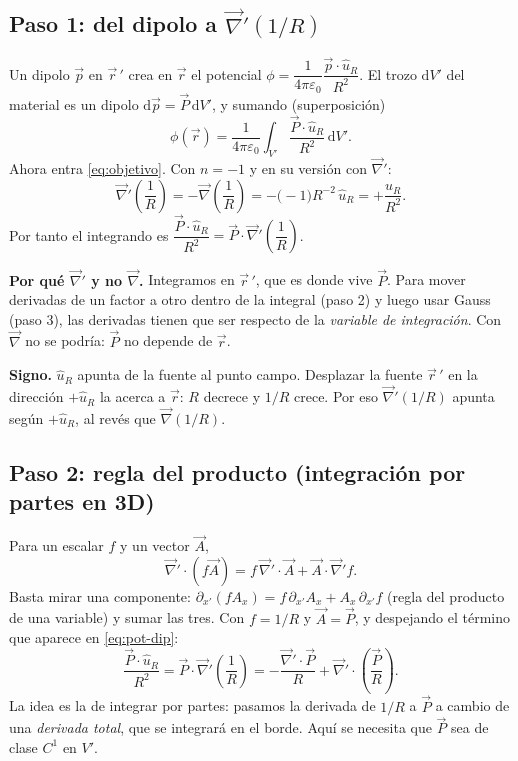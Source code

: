 \documentclass[11pt,a4paper]{article}
\numberwithin{equation}{section}
\newcommand{\vc}[1]{\vec{#1}}
\newcommand{\nab}{\vec{\nabla}}
\newcommand{\uR}{\hat u_R}
\begin{document}
\subsection{Paso 1: del dipolo a $\nab'(1/R)$}
Un dipolo $\vc{p}$ en $\vc{r}\,'$ crea en $\vc{r}$ el potencial
$\phi=\dfrac{1}{4\pi\varepsilon_0}\dfrac{\vc{p}\cdot\uR}{R^{2}}$. El trozo
$\mathrm dV'$ del material es un dipolo $\mathrm d\vc{p}=\vc{P}\,\mathrm dV'$, y
sumando (superposición)
\begin{equation}\label{eq:pot-dip}
  \phi(\vc{r})=\frac{1}{4\pi\varepsilon_0}\int_{V'}
  \frac{\vc{P}\cdot\uR}{R^{2}}\,\mathrm dV'.
\end{equation}
Ahora entra \eqref{eq:objetivo}. Con $n=-1$ y en su versión con $\nab'$:
\begin{equation}\label{eq:nabla-prima-1R}
  \nab'\!\left(\frac1R\right)=-\nab\!\left(\frac1R\right)
  =-\bigl(-1\bigr)R^{-2}\,\uR=+\frac{\uR}{R^{2}} .
\end{equation}
Por tanto el integrando es
$\dfrac{\vc{P}\cdot\uR}{R^{2}}=\vc{P}\cdot\nab'\!\left(\dfrac1R\right)$.

\textbf{Por qué $\nab'$ y no $\nab$.} Integramos en $\vc{r}\,'$, que es donde vive
$\vc{P}$. Para mover derivadas de un factor a otro dentro de la integral (paso
2) y luego usar Gauss (paso 3), las derivadas tienen que ser respecto de la
\emph{variable de integración}. Con $\nab$ no se podría: $\vc{P}$ no depende
de $\vc{r}$.

\textbf{Signo.} $\uR$ apunta de la fuente al punto campo. Desplazar la
fuente $\vc{r}\,'$ en la dirección $+\uR$ la acerca a $\vc{r}$: $R$ decrece y
$1/R$ crece. Por eso $\nab'(1/R)$ apunta según $+\uR$, al revés que
$\nab(1/R)$.

\subsection{Paso 2: regla del producto (integración por partes en 3D)}
Para un escalar $f$ y un vector $\vc{A}$,
\begin{equation}\label{eq:producto}
  \nab'\cdot(f\vc{A})=f\,\nab'\cdot\vc{A}+\vc{A}\cdot\nab' f .
\end{equation}
Basta mirar una componente: $\partial_{x'}(fA_x)=f\,\partial_{x'}A_x+A_x\,\partial_{x'}f$
(regla del producto de una variable) y sumar las tres. Con $f=1/R$ y
$\vc{A}=\vc{P}$, y despejando el término que aparece en \eqref{eq:pot-dip}:
\begin{equation}\label{eq:despeje}
  \frac{\vc{P}\cdot\uR}{R^{2}}=\vc{P}\cdot\nab'\!\left(\frac1R\right)
  =-\frac{\nab'\cdot\vc{P}}{R}+\nab'\cdot\!\left(\frac{\vc{P}}{R}\right).
\end{equation}
La idea es la de integrar por partes: pasamos la derivada de $1/R$ a
$\vc{P}$ a cambio de una \emph{derivada total}, que se integrará en el borde.
Aquí se necesita que $\vc{P}$ sea de clase $C^{1}$ en $V'$.
\end{document}
